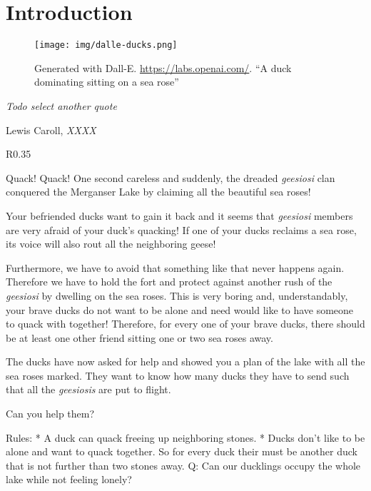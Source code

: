 \chapter{Introduction}\label{ch:introduction}

\vspace*{-50pt}

\begin{figure}[ht]
        \texttt{[image: img/dalle-ducks.png]}
        \captionsetup{textformat=empty,labelformat=blank}
        \caption{Generated with Dall-E. \url{https://labs.openai.com/}. ``A duck dominating sitting on a sea rose''}
\end{figure}

\epigraph{\itshape Todo select another quote}{Lewis Caroll, \textit{XXXX}}

\begin{wrapfigure}{R}{0.35\textwidth}
\end{wrapfigure}

\vspace*{50pt}

Quack! Quack! One second careless and suddenly, the dreaded \textit{geesiosi} clan conquered the Merganser Lake by claiming all the beautiful sea roses! 

Your befriended ducks want to gain it back and it seems that \textit{geesiosi} members are very afraid of your duck's quacking! If one of your ducks reclaims a sea rose, its voice will also rout all the neighboring geese!

Furthermore, we have to avoid that something like that never happens again. Therefore we have to hold the fort and protect against another rush of the \textit{geesiosi} by dwelling on the sea roses. 
This is very boring and, understandably, your brave ducks do not want to be alone and need would like to have someone to quack with together!
Therefore, for every one of your brave ducks, there should be at least one other friend sitting one or two sea roses away.

The ducks have now asked for help and showed you a plan of the lake with all the sea roses marked. They want to know how many ducks they have to send such that all the \textit{geesiosis} are put to flight. 

Can you help them? 


Rules: 
* A duck can quack freeing up neighboring stones.
* Ducks don't like to be alone and want to quack together. So for every duck their must be another duck that is not further than two stones away.
Q: Can our ducklings occupy the whole lake while not feeling lonely?


